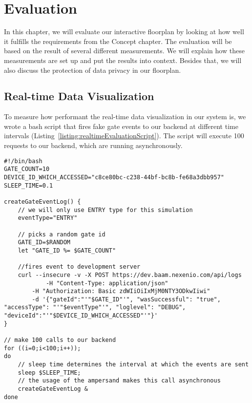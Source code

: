 \section{Evaluation}

In this chapter, we will evaluate our interactive floorplan by looking at how well it fulfills the requirements from the Concept chapter. The evaluation will be based on the result of several different measurements. We will explain how these measurements are set up and put the results into context. Besides that, we will also discuss the protection of data privacy in our floorplan.

\subsection{Real-time Data Visualization}

To measure how performant the real-time data visualization in our system is, we wrote a bash script that fires fake gate events to our backend at different time intervals (Listing~\ref{listing:realtimeEvaluationScript}). The script will execute 100 requests to our backend, which are running asynchronously.

\begin{lstlisting}[label={listing:realtimeEvaluationScript},caption={Bash script for creating fake gate events at intervals}]
#!/bin/bash
GATE_COUNT=10
DEVICE_ID_WHICH_ACCESSED="c8ce80bc-c238-44bf-bc8b-fe68a3dbb957"
SLEEP_TIME=0.1

createGateEventLog() {
    // we will only use ENTRY type for this simulation
    eventType="ENTRY"

    // picks a random gate id 
    GATE_ID=$RANDOM
    let "GATE_ID %= $GATE_COUNT"

    //fires event to development server
    curl --insecure -v -X POST https://dev.baam.nexenio.com/api/logs 
            -H "Content-Type: application/json" 
        -H "Authorization: Basic zdWIiOiIxMjM0NTY3ODkwIiwi" 
        -d '{"gateId":"'"$GATE_ID"'", "wasSuccessful": "true", "accessType": "'"$eventType"'", "loglevel": "DEBUG", "deviceId":"'"$DEVICE_ID_WHICH_ACCESSED"'"}'
}

// make 100 calls to our backend
for ((i=0;i<100;i++));
do
    // sleep time determines the interval at which the events are sent
    sleep $SLEEP_TIME;
    // the usage of the ampersand makes this call asynchronous
    createGateEventLog &
done

\end{lstlisting}

